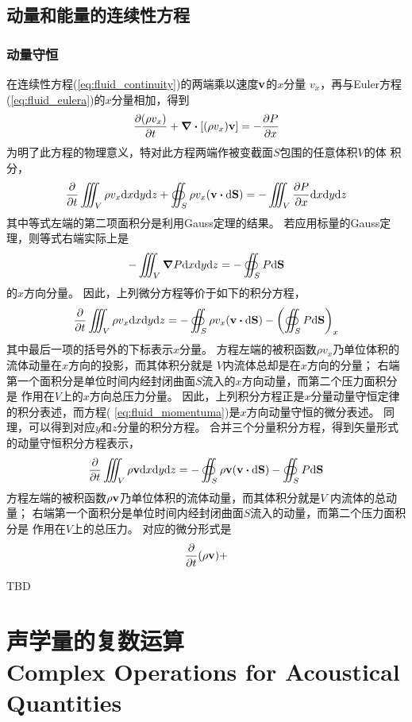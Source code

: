 \documentclass[UTF8]{ctexbook}
\begin{document}
\subsection{动量和能量的连续性方程}
\subsubsection{动量守恒}

在连续性方程(\ref{eq:fluid_continuity})的两端乘以速度$\vb{v}$的$x$分量
$v_x$，再与Euler方程(\ref{eq:fluid_eulera})的$x$分量相加，得到
\begin{equation}
	\pdv{(\rho v_x)}{t} + \div \qty[(\rho v_x)\vb{v}] = -\pdv{P}{x}
	\label{eq:fluid_momentuma}
\end{equation}
为明了此方程的物理意义，特对此方程两端作被变截面$S$包围的任意体积$V$的体
积分，
\[
	\pdv{t} \iiint_V \rho v_x \dd x \dd y \dd z +
	\oiint_S \rho v_x \qty(\vb{v} \vdot \dd \vb{S}) 
	= -\iiint_V \pdv{P}{x} \dd x \dd y \dd z
\]
其中等式左端的第二项面积分是利用Gauss定理的结果。
若应用标量的Gauss定理，则等式右端实际上是
$$
	-\iiint_V \grad P \dd x \dd y \dd z
	= -\oiint_S P \dd \vb{S}
$$
的$x$方向分量。
因此，上列微分方程等价于如下的积分方程，
$$
	\pdv{t}\iiint_V \rho v_x \dd x \dd y \dd z
	=-\oiint_S \rho v_x \qty(\vb{v}\vdot \dd \vb{S}) - \qty(\oiint_S
	P \dd \vb{S})_x
$$
其中最后一项的括号外的下标表示$x$分量。
方程左端的被积函数$\rho v_x$乃单位体积的流体动量在$x$方向的投影，而其体积分就是
$V$内流体总却是在$x$方向的分量；
右端第一个面积分是单位时间内经封闭曲面$S$流入的$x$方向动量，而第二个压力面积分是
作用在$V$上的$x$方向总压力分量。
因此，上列积分方程正是$x$分量动量守恒定律的积分表述，而方程(
\ref{eq:fluid_momentuma})是$x$方向动量守恒的微分表述。
同理，可以得到对应$y$和$z$分量的积分方程。
合并三个分量积分方程，得到矢量形式的动量守恒积分方程表示，
$$
	\pdv{t}\iiint_V \rho \vb{v} \dd x \dd y\dd z = 
	-\oiint_S \rho \vb{v} \qty(\vb{v} \vdot \dd \vb{S})
	-\oiint_S P\dd\vb{S}
$$
方程左端的被积函数$\rho \vb{v}$乃单位体积的流体动量，而其体积分就是$V$
内流体的总动量；
右端第一个面积分是单位时间内经封闭曲面$S$流入的动量，而第二个压力面积分是
作用在$V$上的总压力。
对应的微分形式是
\begin{equation}
	\pdv{t} \qty(\rho \vb{v}) +
\end{equation}

TBD


\section{声学量的复数运算\\
Complex Operations for Acoustical Quantities}
\end{document}
